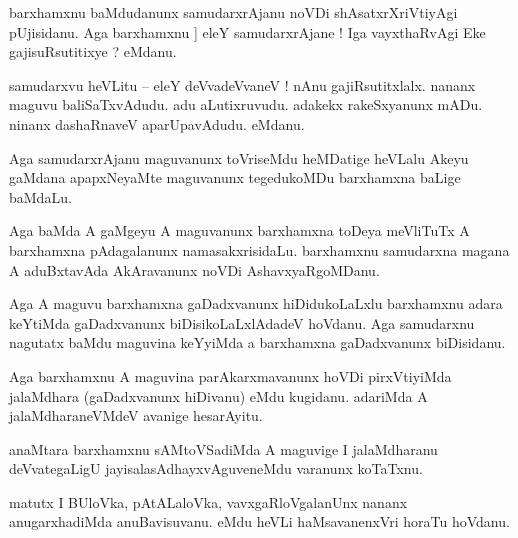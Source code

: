 \documentclass{article}
\begin{document}
\begin{mn}%
barxhamxnu baMdudanunx samudarxrAjanu noVDi shAsatxrXriVtiyAgi pUjisidanu. Aga barxhamxnu ]
eleY samudarxrAjane ! Iga vayxthaRvAgi Eke gajisuRsutitixye ? eMdanu.
\end{mn}

\begin{mn}%
samudarxvu heVLitu -- eleY deVvadeVvaneV ! nAnu gajiRsutitxlalx. nananx maguvu 
baliSaTxvAdudu. adu aLutixruvudu. adakekx rakeSxyanunx mADu. ninanx dashaRnaveV 
aparUpavAdudu. eMdanu.
\end{mn}

\begin{mn}%
Aga samudarxrAjanu maguvanunx toVriseMdu heMDatige heVLalu Akeyu gaMdana apapxNeyaMte 
maguvanunx tegedukoMDu barxhamxna baLige baMdaLu.
\end{mn}

\begin{mn}%
Aga baMda A gaMgeyu A maguvanunx barxhamxna toDeya meVliTuTx A barxhamxna pAdagalanunx 
namasakxrisidaLu. barxhamxnu samudarxna magana A aduBxtavAda AkAravanunx noVDi 
AshavxyaRgoMDanu.
\end{mn}

\begin{mn}%
Aga A maguvu barxhamxna gaDadxvanunx hiDidukoLaLxlu barxhamxnu adara keYtiMda gaDadxvanunx 
biDisikoLaLxlAdadeV hoVdanu. Aga samudarxnu nagutatx baMdu maguvina keYyiMda a barxhamxna 
gaDadxvanunx biDisidanu.
\end{mn}

\begin{mn}%
Aga barxhamxnu A maguvina parAkarxmavanunx hoVDi pirxVtiyiMda jalaMdhara (gaDadxvanunx 
hiDivanu) eMdu kugidanu. adariMda A jalaMdharaneVMdeV avanige hesarAyitu.
\end{mn}

\begin{mn}%
anaMtara barxhamxnu sAMtoVSadiMda A maguvige I jalaMdharanu deVvategaLigU 
jayisalasAdhayxvAguveneMdu varanunx koTaTxnu.
\end{mn}

\begin{mn}%
matutx I BUloVka, pAtALaloVka, vavxgaRloVgalanUnx nananx anugarxhadiMda anuBavisuvanu. eMdu 
heVLi haMsavanenxVri horaTu hoVdanu.
\end{mn}

\end{document}
